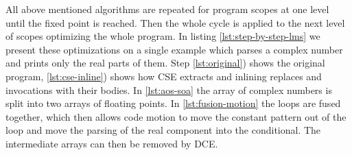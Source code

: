 All above mentioned algorithms are repeated for program scopes at one level until the fixed point is reached. Then the whole cycle is applied to the next level of scopes optimizing the whole program. In listing \ref{lst:step-by-step-lms} we present these optimizations on a single example which parses a complex number and prints only the real parts of them. Step \ref{lst:original}) shows the original program, \ref{lst:cse-inline}) shows how CSE extracts  and inlining replaces  and  invocations with their bodies. In \ref{lst:aos-soa} the array  of complex numbers is split into two arrays of floating points. 
In \ref{lst:fusion-motion} the loops are fused together, which then allows code motion to move the constant pattern out of the loop and move the parsing of the real component into the conditional. The intermediate arrays can then be removed by DCE.

